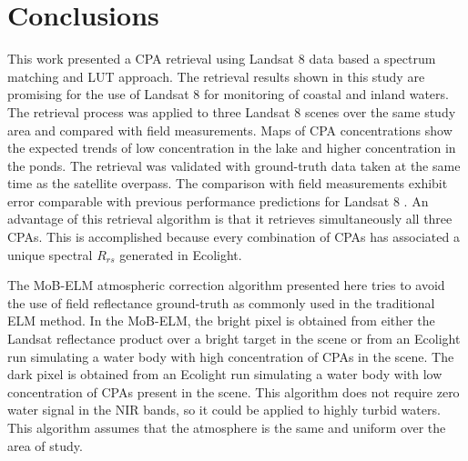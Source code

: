 \documentclass[onecolumn,3p,letterpaper,11pt]{elsarticle}
\begin{document}
\section{Conclusions}
This work presented a CPA retrieval using Landsat 8 data based a spectrum matching and LUT approach. The retrieval results shown in this study are promising for the use of Landsat 8 for monitoring of coastal and inland waters. The retrieval process was applied to three Landsat 8 scenes over the same study area and compared with field measurements. Maps of CPA concentrations show the expected trends of low concentration in the lake and higher concentration in the ponds. The retrieval was validated with ground-truth data taken at the same time as the satellite overpass. The comparison with field measurements exhibit error comparable with previous performance predictions for Landsat 8 \citep{Gerace:2013}. An advantage of this retrieval algorithm is that it retrieves simultaneously all three CPAs. This is accomplished because every combination of CPAs has associated a unique spectral $R_{rs}$ generated in Ecolight.

The MoB-ELM atmospheric correction algorithm presented here tries to avoid the use of field reflectance ground-truth as commonly used in the traditional ELM method. In the MoB-ELM, the bright pixel is obtained from either the Landsat reflectance product over a bright target in the scene or from an Ecolight run simulating a water body with high concentration of CPAs in the scene. The dark pixel is obtained from an Ecolight run simulating a water body with low concentration of CPAs present in the scene. This algorithm does not require zero water signal in the NIR bands, so it could be applied to highly turbid waters. This algorithm assumes that the atmosphere is the same and uniform over the area of study.

\end{document}
